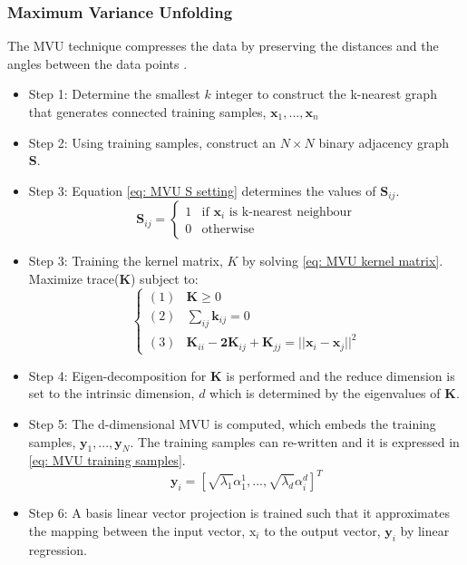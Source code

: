 \documentclass[11pt]{article}
\begin{document}
	\subsubsection{Maximum Variance Unfolding}
	The MVU technique compresses the data by preserving the distances and the angles between the data points \cite{Shao2009}. 
	\begin{itemize}
		\item Step 1: Determine the smallest $k$ integer to construct the k-nearest graph that generates connected training samples, $\textbf{x}_1, . . . ,\textbf{x}_n$ \\
		\item Step 2: Using training samples, construct an $N \times N$ binary adjacency graph \textbf{S}. \\
		\item Step 3: Equation \eqref{eq: MVU S setting} determines the values of $\textbf{S}_{ij}$.
		\begin{equation}
			\label{eq: MVU S setting}
			\textbf{S}_{ij} = 
			\begin{cases}
				1 & \text{if } \textbf{x}_i \text{ is k-nearest neighbour} \\
				0 & \text{otherwise}
			\end{cases}
		\end{equation}
		\item Step 3: Training the kernel matrix, $K$ by solving \eqref{eq: MVU kernel matrix}.
		\newline
		Maximize trace(\textbf{K}) subject to:
		\begin{equation}
			\label{eq: MVU kernel matrix}
			\begin{cases}
				(1) &\textbf{K} \geq 0 \\
				(2) &\sum_{ij}\textbf{k}_{ij} = 0 \\
				(3) &\textbf{K}_{ii} - \textbf{2K}_{ij} + \textbf{K}_{jj} = ||\textbf{x}_i - \textbf{x}_j||^2
			\end{cases}
		\end{equation}
		\item Step 4: Eigen-decomposition for $\textbf{K}$ is performed and the reduce dimension is set to the intrinsic dimension, $d$ which is determined by the eigenvalues of $\textbf{K}$.\\
		\item Step 5: The d-dimensional MVU is computed, which embeds the training samples, $\textbf{y}_1, . . . , \textbf{y}_N$. The training samples can re-written and it is expressed in \eqref{eq: MVU training samples}.
		\begin{equation}
			\label{eq: MVU training samples}
			\textbf{y}_i = [\sqrt{\lambda_1}\alpha_1^1, . . . ,\sqrt{\lambda_d}\alpha_i^d]^T
		\end{equation}
		\item Step 6: A basis linear vector projection is trained such that it approximates the mapping between the input vector, $\text{x}_i$ to the output vector, $\textbf{y}_i$ by linear regression.
	\end{itemize}
	
\end{document}

